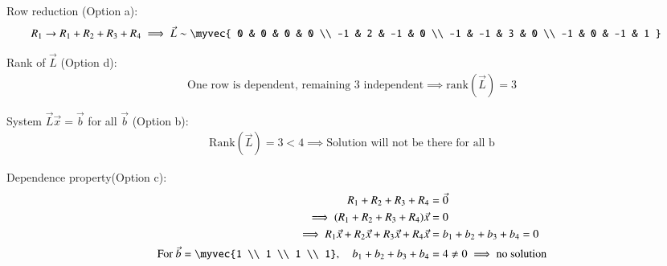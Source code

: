 \documentclass[journal]{article}
\begin{document}
Row reduction (Option a):
\begin{align}
R_1 \rightarrow{R_1 + R_2 + R_3 + R_4}\implies 
\vec{L} &\sim
\myvec{
0 & 0 & 0 & 0 \\
-1 & 2 & -1 & 0 \\
-1 & -1 & 3 & 0 \\
-1 & 0 & -1 & 1
} 
\end{align}


 Rank of  $\vec{L}$ (Option d):
 \begin{align}
\text{One row is dependent, remaining 3 independent} \implies \text{rank}(\vec{L}) = 3
\end{align}

System  $\vec{L} \vec{x} = \vec{b}$ for all  $\vec{b}$ (Option b): 
\begin{align}
\text{Rank}(\vec{L}) = 3 < 4 \implies \text{Solution will not be there for all b}
\end{align}

Dependence property(Option c):
 \begin{align}
R_1 + R_2 + R_3 + R_4 &= \vec{0} \\
\implies (R_1 + R_2 + R_3 + R_4)\vec{x} &= 0 \\
\implies R_1\vec{x} + R_2\vec{x} + R_3\vec{x} + R_4\vec{x} &= b_1 + b_2 + b_3 + b_4 = 0 \\
\text{For } \vec{b} = \myvec{1 \\ 1 \\ 1 \\ 1}, \quad b_1+b_2+b_3+b_4 &= 4 \neq 0 \implies \text{no solution}
\end{align}
\end{document}

